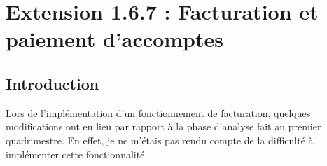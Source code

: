 \section{Extension 1.6.7 : Facturation et paiement d'accomptes}
\subsection{Introduction}
\begin{flushleft}
Lors de l'implémentation d'un fonctionnement de facturation, quelques modifications ont eu lieu par rapport à la phase d'analyse fait au premier quadrimestre. En effet, je ne m'étais pas rendu compte de la difficulté à implémenter cette fonctionnalité
\end{flushleft}

